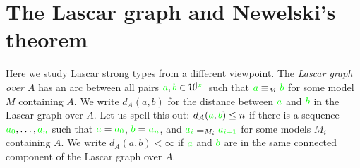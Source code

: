 \documentclass[creche.tex]{subfiles}
\begin{document}
\begin{comment}
\begin{proposition}\label{prop_exisntence_coheirs_over_sets}
Assume $A$ is a coheir extension base. Then every type $q({\mr x})\subseteq L(\U)$ almost satisfiable in $A$ has an extension to a global type almost satisfiable in $A$.
\end{proposition}

\begin{proof} 
As in the proof of Proposition~\ref{prop_exisntence_coheirs}. Let $p({\mr x})\subseteq L(\U)$ be maximal among the types containing $q({\mr x})$ and finitely satisfiable in $A$. We prove that $p({\mr x})$ is complete. If for a contradiction that $p({\mr x})$ contains neither $\psi({\mr x})$ nor $\neg\psi({\mr x})$. Then for some formula $\psi({\mr x})\in p$ neither $\psi({\mr x})\cup\big\{\psi({\mr x})\big\}$ nor $\psi({\mr x})\cup\big\{\neg\psi({\mr x})\big\}$ is finitely satisfiable in $A$. The disjunction of these two formulas is $\psi({\mr x})$. So, this contradicts the finite satisfiability of $p({\mr x})$.
\end{proof}



\end{comment}


\section{The Lascar graph and Newelski's theorem}\label{newelski}

Here we study Lascar strong types from a different viewpoint. The \emph{Lascar graph over $A$\/} has an arc between all pairs ${\color{green} a},{\color{green} b}\in \EuScript U^{|{\color{green} z}|}$ such that  ${\color{green} a}\equiv_M{\color{green} b}$ for some model $M$ containing $A$. We write \emph{$d_A(a,b)$\/} for the distance between ${\color{green} a}$ and ${\color{green} b}$ in the Lascar graph over $A$. Let us spell this out: $d_A({\color{green} a},{\color{green} b})\le n$ if there is a sequence ${\color{green} a_0},\dots,{\color{green} a_n}$ such that ${\color{green} a}={\color{green} a_0}$, ${\color{green} b}={\color{green} a_n}$, and ${\color{green} a_i}\equiv_{M_i}{\color{green} a_{i+1}}$ for some models $M_i$ containing $A$. We write \emph{$d_A(a,b)<\infty$\/} if ${\color{green} a}$ and ${\color{green} b}$ are in the same connected component of the Lascar graph over $A$.
\end{document}

